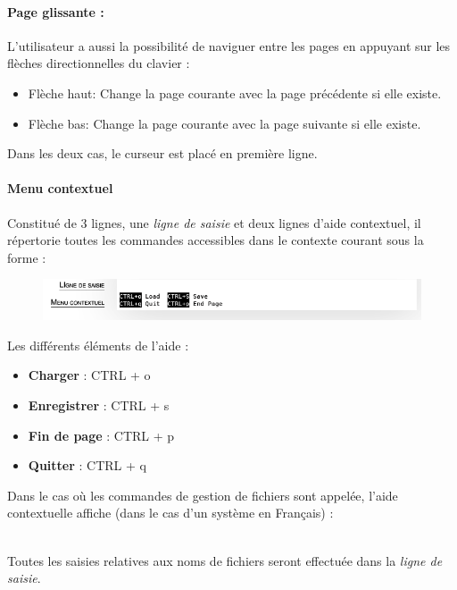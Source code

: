 \paragraph{Page glissante :}
L'utilisateur a aussi la possibilité de naviguer entre les pages en appuyant sur les flèches directionnelles du clavier :
\begin{itemize}
	\item \og Flèche haut\fg : Change la page courante avec la page précédente si elle existe.
	\item \og Flèche bas\fg : Change la page courante avec la page suivante si elle existe.
\end{itemize}
Dans les deux cas, le curseur est placé en première ligne.

\paragraph{Menu contextuel}
Constitué de 3 lignes, une \textsl{ligne de saisie} et deux lignes d'aide contextuel, il répertorie toutes les commandes accessibles dans le contexte courant sous la forme :
\begin{center}
\begin{figure}[H]
    \includegraphics[width=15cm]{img/MenuContextuel}
	\vspace{-1cm}
\end{figure}
\end{center}

Les différents éléments de l'aide :
\begin{itemize}
	\item \textbf{Charger} : \og CTRL + o\fg
	\item \textbf{Enregistrer} : \og CTRL + s\fg
	\item \textbf{Fin de page} : \og CTRL + p\fg
	\item \textbf{Quitter} : \og CTRL + q\fg
\end{itemize}

Dans le cas où les commandes de gestion de fichiers sont appelée, l'aide contextuelle affiche (dans le cas d'un système en Français) :\\
\begin{center}
\end{center}
~\\
Toutes les saisies relatives aux noms de fichiers seront effectuée dans la \textsl{ligne de saisie}.

